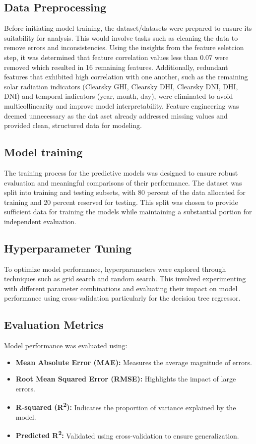 \documentclass[10pt,twocolumn]{article}
\begin{document}
\subsection{Data Preprocessing}
Before initiating model training, the dataset/datasets were 
prepared to ensure its suitability for analysis. This would involve tasks such as cleaning the data to remove errors and inconsistencies. Using the insights from the feature seletcion step, it was determined that feature correlation values less than 0.07 were removed which resulted in 16 remaining features. Additionally, redundant features that exhibited high correlation with one another, such as the remaining solar radiation indicators (Clearsky GHI, Clearsky DHI, Clearsky DNI, DHI, DNI) and temporal indicators (year, month, day), were eliminated to avoid multicollinearity and improve model interpretability. Feature engineering was deemed unnecessary as the dat
aset already addressed missing values and provided clean, structured data for modeling. 
 
 


\subsection{Model training} The training process for the predictive models was designed to ensure robust evaluation and meaningful comparisons of their performance. The dataset was split into training and testing subsets, with 80 percent of the data allocated for training and 20 percent reserved for testing. This split was chosen to provide sufficient data for training the models while maintaining a substantial portion for independent evaluation.

\subsection{Hyperparameter Tuning}To optimize model performance, hyperparameters were explored through techniques such as grid search and  random search. This involved experimenting with different parameter combinations and evaluating their impact on model performance using cross-validation particularly for the decision tree regressor.



\subsection{Evaluation Metrics}

Model performance was evaluated using:
\begin{itemize}
    \item \textbf{Mean Absolute Error (MAE):} Measures the average magnitude of errors.
    \item \textbf{Root Mean Squared Error (RMSE):} Highlights the impact of large errors.
    \item \textbf{R-squared (R\textsuperscript{2}):} Indicates the proportion of variance explained by the model.
    \item \textbf{Predicted R\textsuperscript{2}:} Validated using cross-validation to ensure generalization.
\end{itemize}
\end{document}
